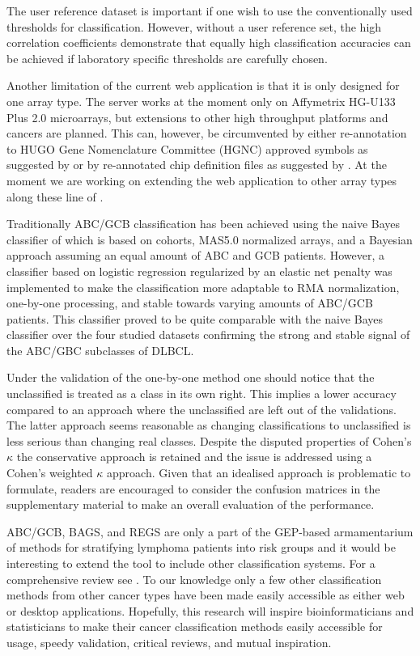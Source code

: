 \documentclass[10pt,letterpaper]{article}
\begin{document}
The user reference dataset is important if one wish to use the conventionally used thresholds for classification.
However, without a user reference set, the high correlation coefficients demonstrate that equally high classification accuracies can be achieved if laboratory specific thresholds are carefully chosen.

Another limitation of the current web application is that it is only designed for one array type.
The server works at the moment only on Affymetrix HG-U133 Plus 2.0 microarrays, but extensions to other high throughput platforms and cancers are planned.
This can, however, be circumvented by either re-annotation to HUGO Gene Nomenclature Committee (HGNC) approved symbols as suggested by \cite{Care2013} or by re-annotated chip definition files as suggested by \cite{Dai2005}.
At the moment we are working on extending the web application to other array types along these line of \cite{Dai2005}.

Traditionally ABC/GCB classification has been achieved using the naive Bayes classifier of \cite   {Wright2003} which is based on cohorts, MAS5.0 normalized arrays, and a Bayesian approach assuming an equal amount of ABC and GCB patients.
However, a classifier based on logistic regression regularized by an elastic net penalty was implemented to make the classification more adaptable to RMA normalization, one-by-one processing, and stable towards varying amounts of ABC/GCB patients.
This classifier proved to be quite comparable with the naive Bayes classifier over the four studied datasets confirming the strong and stable signal of the ABC/GBC subclasses of DLBCL.

Under the validation of the one-by-one method one should notice that the unclassified is treated as a class in its own right.
This implies a lower accuracy compared to an approach where the unclassified are left out of the validations.
The latter approach seems reasonable as changing classifications to unclassified is less serious than changing real classes.
Despite the disputed properties of Cohen's $\kappa$ the conservative approach is retained and the issue is addressed using a Cohen's weighted $\kappa$ approach.
Given that an idealised approach is problematic to formulate, readers are encouraged to consider the confusion matrices in the supplementary material to make an overall evaluation of the performance.

ABC/GCB, BAGS, and REGS are only a part of the GEP-based armamentarium of methods for stratifying lymphoma patients into risk groups \cite{Shipp2002, Lossos2004a, Malumbres2008} and it would be interesting to extend the tool to include other classification systems.
For a comprehensive review see \cite{Coutinho2013}.
To our knowledge only a few other classification methods from other cancer types have been made easily accessible as either web or desktop applications.
Hopefully, this research will inspire bioinformaticians and statisticians to make their cancer classification methods easily accessible for usage, speedy validation, critical reviews, and mutual inspiration.
\end{document}
